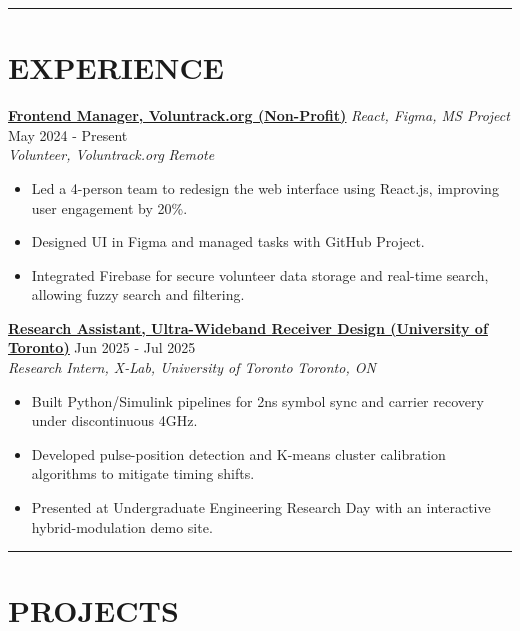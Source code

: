 \documentclass[letterpaper,10pt]{article}
\begin{document}
\noindent\rule{\linewidth}{1pt}

\section*{\textbf{EXPERIENCE}}

\noindent\href{https://volun-track.web.app}{\uline{
\textbf{Frontend Manager, Voluntrack.org (Non-Profit)}}} \textit{React, Figma, MS Project} \hfill May 2024 - Present\\
\textit{Volunteer, Voluntrack.org} \hfill \textit{Remote}
\begin{itemize}[leftmargin=0.2in]
    \item Led a 4-person team to redesign the web interface using React.js, improving user engagement by 20\%.
    \item Designed UI in Figma and managed tasks with GitHub Project.
    \item Integrated Firebase for secure volunteer data storage and real-time search, allowing fuzzy search and filtering.
\end{itemize}

\vspace{0.2cm}
\noindent\href{https://github.com/Ken-2511/ppm-psk-visualize}
{\uline{\textbf{Research Assistant, Ultra-Wideband Receiver Design (University of Toronto)}}} \hfill Jun 2025 - Jul 2025\\
\textit{Research Intern, X-Lab, University of Toronto} \hfill \textit{Toronto, ON}
\begin{itemize}[leftmargin=0.2in]
    \item Built Python/Simulink pipelines for 2ns symbol sync and carrier recovery under discontinuous 4GHz.
    \item Developed pulse-position detection and K-means cluster calibration algorithms to mitigate timing shifts.
    \item Presented at Undergraduate Engineering Research Day with an interactive hybrid-modulation demo site.
\end{itemize}

\noindent\rule{\linewidth}{1pt}

\section*{\textbf{PROJECTS}}
\end{document}
